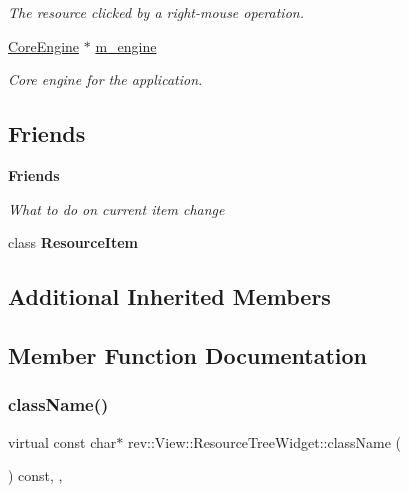 \begin{Indent}
\begin{DoxyCompactItemize}
\begin{DoxyCompactList}\small\item\em The resource clicked by a right-\/mouse operation. \end{DoxyCompactList}\item 
\mbox{\label{classrev_1_1_view_1_1_resource_tree_widget_a1b7f486d8462504533b8171b878fdcb5}} 
\mbox{\hyperlink{classrev_1_1_core_engine}{Core\+Engine}} $\ast$ \mbox{\hyperlink{classrev_1_1_view_1_1_resource_tree_widget_a1b7f486d8462504533b8171b878fdcb5}{m\+\_\+engine}}
\begin{DoxyCompactList}\small\item\em Core engine for the application. \end{DoxyCompactList}\end{DoxyCompactItemize}
\end{Indent}
\subsection*{Friends}
\begin{Indent}\textbf{ Friends}\par
{\em What to do on current item change }\begin{DoxyCompactItemize}
\item 
\mbox{\label{classrev_1_1_view_1_1_resource_tree_widget_a1039607958f9e5946cdd576632f23fa9}} 
class {\bfseries Resource\+Item}
\end{DoxyCompactItemize}
\end{Indent}
\subsection*{Additional Inherited Members}


\subsection{Member Function Documentation}
\mbox{\label{classrev_1_1_view_1_1_resource_tree_widget_ab15fda44cb0727f860a2d1071fefb104}} 
\subsubsection{\texorpdfstring{className()}{className()}}
{\footnotesize\ttfamily virtual const char$\ast$ rev\+::\+View\+::\+Resource\+Tree\+Widget\+::class\+Name (\begin{DoxyParamCaption}{ }\end{DoxyParamCaption}) const\hspace{0.3cm}{\ttfamily [inline]}, {\ttfamily [override]}, {\ttfamily [virtual]}}



